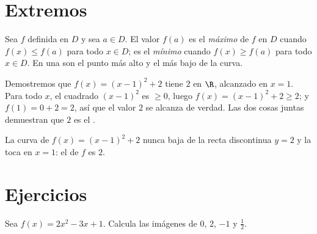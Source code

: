 \section{Extremos}

\begin{definition}\label{def:g10:functions:extrema}
Sea $f$ definida en $D$ y sea $a \in D$. El valor $f(a)$ es el
\emph{máximo} de $f$ en $D$ cuando $f(x) \leq f(a)$ para
todo $x \in D$; es el \emph{mínimo} cuando
$f(x) \geq f(a)$ para todo $x \in D$. En una  son el punto más alto
y el más bajo de la curva.
\end{definition}

\begin{example}\label{ex:g10:functions:extremum}
Demostremos que $f(x) = (x - 1)^2 + 2$ tiene  $2$ en $\R$, alcanzado
en $x = 1$. Para todo $x$, el cuadrado $(x-1)^2$ es $\geq 0$, luego
$f(x) = (x-1)^2 + 2 \geq 2$; y $f(1) = 0 + 2 = 2$, así que el valor $2$ se
alcanza de verdad. Las dos cosas juntas demuestran que $2$ es el .
\end{example}

\begin{omfigure}

{\small La curva de $f(x) = (x-1)^2 + 2$ nunca baja de la recta discontinua
$y = 2$ y la toca en $x = 1$: el  de $f$ es $2$.}
\end{omfigure}

\section{Ejercicios}

\begin{exercise}[$\star$]\label{exo:g10:functions:1}
Sea $f(x) = 2x^2 - 3x + 1$. Calcula las imágenes de $0$, $2$, $-1$ y
$\frac12$.
\end{exercise}

